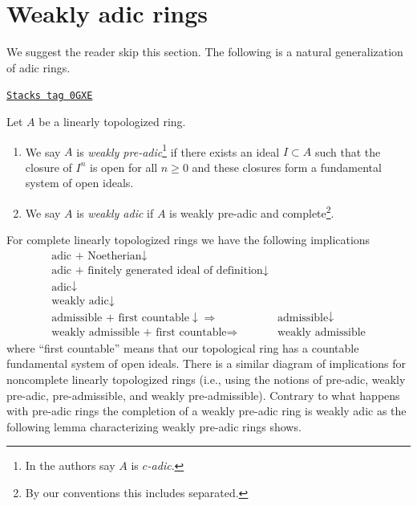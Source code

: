\section{Weakly adic rings}
\label{formal-spaces-section-weakly-adic}
We suggest the reader skip this section. The following is a natural
generalization of adic rings.

\begin{definition}
\label{formal-spaces-definition-weakly-adic}
\href{https://stacks.math.columbia.edu/tag/0GXE}{\texttt{Stacks tag 0GXE}}

\begin{reference}
\cite[Definition 8.3.8]{Gabber-Ramero}
\end{reference}
Let $A$ be a linearly topologized ring.
\begin{enumerate}
\item We say $A$ is {\it weakly pre-adic}\footnote{In \cite{Gabber-Ramero} the
authors say $A$ is {\it $c$-adic}.} if there exists an ideal
$I \subset A$ such that the closure of $I^n$ is open for all $n \geq 0$
and these closures form a fundamental system of open ideals.
\item We say $A$ is {\it weakly adic} if $A$ is weakly pre-adic
and complete\footnote{By our conventions this includes separated.}.
\end{enumerate}
\end{definition}

For complete linearly topologized rings we have the following implications
$$
\begin{array}{cc}\text{adic + Noetherian} \downarrow &  \\ \text{adic + finitely generated ideal of definition} \downarrow &  \\ \text{adic} \downarrow &  \\ \text{weakly adic} \downarrow &  \\ \text{admissible + first countable} \downarrow\Longrightarrow & \text{admissible} \downarrow \\ \text{weakly admissible + first countable} \Longrightarrow & \text{weakly admissible}\end{array}
$$
where ``first countable'' means that our topological ring has a countable
fundamental system of open ideals. There is a similar diagram of implications
for noncomplete linearly topologized rings (i.e., using the notions
of pre-adic, weakly pre-adic, pre-admissible, and weakly pre-admissible).
Contrary to what happens with pre-adic rings the completion of a
weakly pre-adic ring is weakly adic as the following lemma
characterizing weakly pre-adic rings shows.

